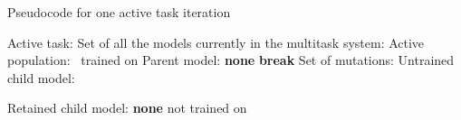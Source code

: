 \documentclass{article} \usepackage{iclr2023_conference,times}
\begin{document}
\clearpage

\begin{algorithm}
\caption{Pseudocode for one active task iteration}
\label{algo}
\begin{algorithmic}[1]
\State Active task: 
\State Set of all the models currently in the multitask system: 
\State Active population: \ trained on  \For{}
    \For{}
        \State {}
        \State Parent model:  \textbf{none}
            \If{}
                \State 
                \State \textbf{break}
            \EndIf
        \EndFor
            \State 
        \EndIf
        \State  {}
        \State Set of mutations: 
            \If{}
                \State  
            \EndIf
        \EndFor
        \State Untrained child model: 

        \State  {}
        \State Retained child model:  \textbf{none}
        \For{}
            \State 
                \State 
            \EndIf
        \EndFor
            \State 
        \EndIf
    \EndFor
\EndFor
\State {}
\State  not trained on 

\end{algorithmic}
\end{algorithm}
\end{document}
